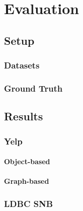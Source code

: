  \chapter{Evaluation}
 \section{Setup}
 \subsection{Datasets}
 \subsection{Ground Truth}\label{subsec:ground-truth}
   
  \section{Results}
    \subsection{Yelp}
        \subsubsection{Object-based}
        \subsubsection{Graph-based}
        
    \subsection{LDBC SNB}
        